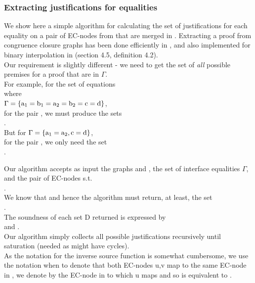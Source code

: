 \subsubsection*{Extracting justifications for equalities}\label{extracting_justification}
We show here a simple algorithm for calculating the set of justifications for each equality on a pair of EC-nodes from  that are merged in . 
Extracting a proof from congruence closure graphs has been done efficiently in \cite{DBLP:conf/rta/NieuwenhuisO05}, and also implemented for binary interpolation in \cite{FuchsGoelGrundyKrsticTinelli2012} (section 4.5, definition 4.2).\\
Our requirement is slightly different - we need to get the set of \emph{all} possible premises for a proof that are in $\Gamma$.\\
For example, for the set of equations \\
 where\\
 $\Gamma = \left\{\mathrm{a_1=b_1=a_2=b_2=c=d}\right\}$,\\
 for the pair , we must produce the sets \\
. \\
But for $\Gamma = \left\{\mathrm{a_1=a_2,c=d}\right\}$,\\
 for the pair , we only need the set \\
. 

Our algorithm accepts as input the graphs  and , the set of interface equalities $\Gamma$, and the pair of EC-nodes  s.t. \\
.\\
We know that  and hence the algorithm must return, at least, the set\\
.\\
The soundness of each set D returned is expressed by \\
 and .\\
Our algorithm simply collects all possible justifications recursively until saturation (needed as  might have cycles).\\
As the notation for the inverse source function is somewhat cumbersome, we use the notation  when  to denote that both EC-nodes u,v map to the same EC-node in , we denote by  the EC-node in  to which u maps and so 
 is equivalent to .

